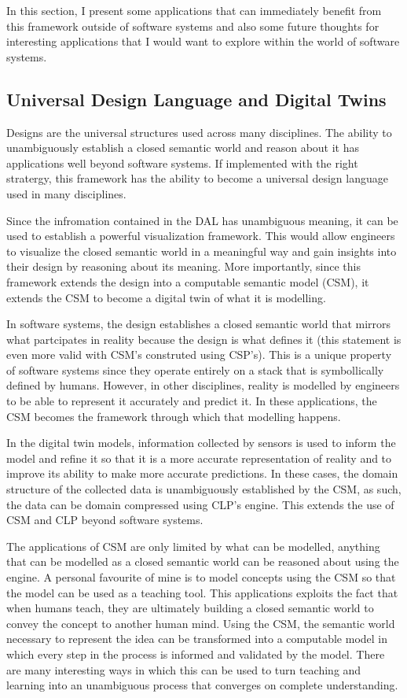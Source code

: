 In this section, I present some applications that can immediately benefit from this framework outside of software systems and also some future thoughts for interesting applications that I would want to explore within the world of software systems.

\subsection{Universal Design Language and Digital Twins}

Designs are the universal structures used across many disciplines. The ability to unambiguously establish a closed semantic world and reason about it has applications well beyond software systems. If implemented with the right stratergy, this framework has the ability to become a universal design language used in many disciplines.

Since the infromation contained in the DAL has unambiguous meaning, it can be used to establish a powerful visualization framework. This would allow engineers to visualize the closed semantic world in a meaningful way and gain insights into their design by reasoning about its meaning. More importantly, since this framework extends the design into a computable semantic model (CSM), it extends the CSM to become a digital twin of what it is modelling.

In software systems, the design establishes a closed semantic world that mirrors what partcipates in reality because the design is what defines it (this statement is even more valid with CSM's construted using CSP's). This is a unique property of software systems since they operate entirely on a stack that is symbollically defined by humans. However, in other disciplines, reality is modelled by engineers to be able to represent it accurately and predict it. In these applications, the CSM becomes the framework through which that modelling happens. 

In the digital twin models, information collected by sensors is used to inform the model and refine it so that it is a more accurate representation of reality and to improve its ability to make more accurate predictions. In these cases, the domain structure of the collected data is unambiguously established by the CSM, as such, the data can be domain compressed using CLP's engine. This extends the use of CSM and CLP beyond software systems. 

The applications of CSM are only limited by what can be modelled, anything that can be modelled as a closed semantic world can be reasoned about using the engine. A personal favourite of mine is to model concepts using the CSM so that the model can be used as a teaching tool. This applications exploits the fact that when humans teach, they are ultimately building a closed semantic world to convey the concept to another human mind. Using the CSM, the semantic world necessary to represent the idea can be transformed into a computable model in which every step in the process is informed and validated by the model. There are many interesting ways in which this can be used to turn teaching and learning into an unambiguous process that converges on complete understanding.

